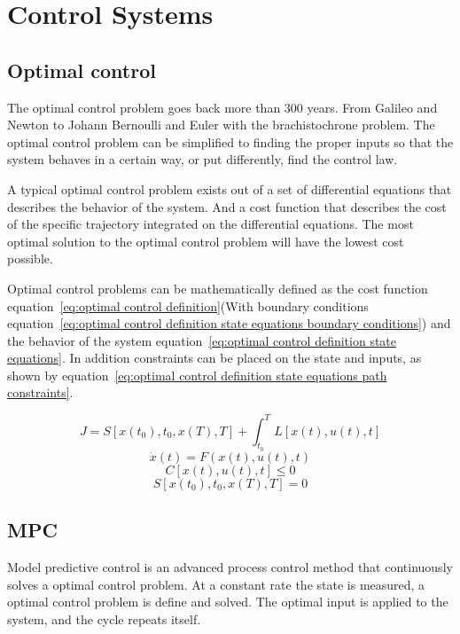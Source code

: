 \chapter{Control Systems}
\section{Optimal control}
	The optimal control problem goes back more than 300 years. From Galileo and Newton to Johann Bernoulli and Euler with the brachistochrone problem. The optimal control problem can be simplified to finding the proper inputs so that the system behaves in a certain way, or put differently, find the control law.
	
	A typical optimal control problem exists out of a set of differential equations that describes the behavior of the system. And a cost function that describes the cost of the specific trajectory integrated on the differential equations. The most optimal solution to the optimal control problem will have the lowest cost possible.
	
	Optimal control problems can be mathematically defined as the cost function equation~\ref{eq:optimal control definition}(With boundary conditions equation~\ref{eq:optimal control definition state equations boundary conditions})  and the behavior of the system equation~\ref{eq:optimal control definition state equations}. In addition constraints can be placed on the state and inputs, as shown by equation~\ref{eq:optimal control definition state equations path constraints}. 
	
	\begin{equation}
		J = S[x(t_0),t_0,x(T),T] + \int_{t_0}^{T} L[x(t),u(t),t]
		\label{eq:optimal control definition}
	\end{equation}
	\begin{equation}
		\dot{x}(t) = F(x(t),u(t),t)
		\label{eq:optimal control definition state equations}
	\end{equation}
	\begin{equation}
		C[x(t),u(t),t]\le 0
		\label{eq:optimal control definition state equations path constraints}
	\end{equation}
	\begin{equation}
		S[x(t_0),t_0,x(T),T]=0
		\label{eq:optimal control definition state equations boundary conditions}
	\end{equation}

\section{MPC}
	Model predictive control is an advanced process control method that continuously solves a  optimal control problem. At a constant rate the state is measured, a optimal control problem is define and solved. The  optimal input is applied to the system, and the cycle repeats itself.
	
